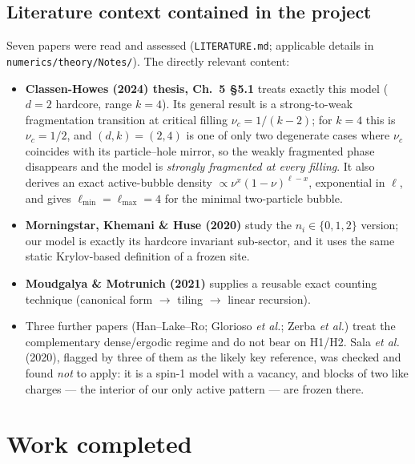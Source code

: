 \documentclass[11pt,a4paper]{article}
\begin{document}
\subsection{Literature context contained in the project}
Seven papers were read and assessed (\texttt{LITERATURE.md}; applicable
details in \texttt{numerics/theory/Notes/}). The directly relevant content:
\begin{itemize}
\item \textbf{Classen-Howes (2024) thesis, Ch.~5 §5.1} treats exactly this
model ($d=2$ hardcore, range $k=4$). Its general result is a
strong-to-weak fragmentation transition at critical filling
$\nu_c=1/(k-2)$; for $k=4$ this is $\nu_c=1/2$, and $(d,k)=(2,4)$ is one of
only two degenerate cases where $\nu_c$ coincides with its particle--hole
mirror, so the weakly fragmented phase disappears and the model is
\emph{strongly fragmented at every filling}. It also derives an exact
active-bubble density $\propto\nu^x(1-\nu)^{\ell-x}$, exponential in
$\ell$, and gives $\ell_{\min}=\ell_{\max}=4$ for the minimal two-particle
bubble.
\item \textbf{Morningstar, Khemani \& Huse (2020)} study the $n_i\in\{0,1,2\}$
version; our model is exactly its hardcore invariant sub-sector, and it uses
the same static Krylov-based definition of a frozen site.
\item \textbf{Moudgalya \& Motrunich (2021)} supplies a reusable exact
counting technique (canonical form $\to$ tiling $\to$ linear recursion).
\item Three further papers (Han--Lake--Ro; Glorioso \textit{et al.};
Zerba \textit{et al.}) treat the complementary dense/ergodic regime and do
not bear on H1/H2. Sala \textit{et al.} (2020), flagged by three of them as
the likely key reference, was checked and found \emph{not} to apply: it is a
spin-1 model with a vacancy, and blocks of two like charges --- the interior
of our only active pattern --- are frozen there.
\end{itemize}

\section{Work completed}
\end{document}
